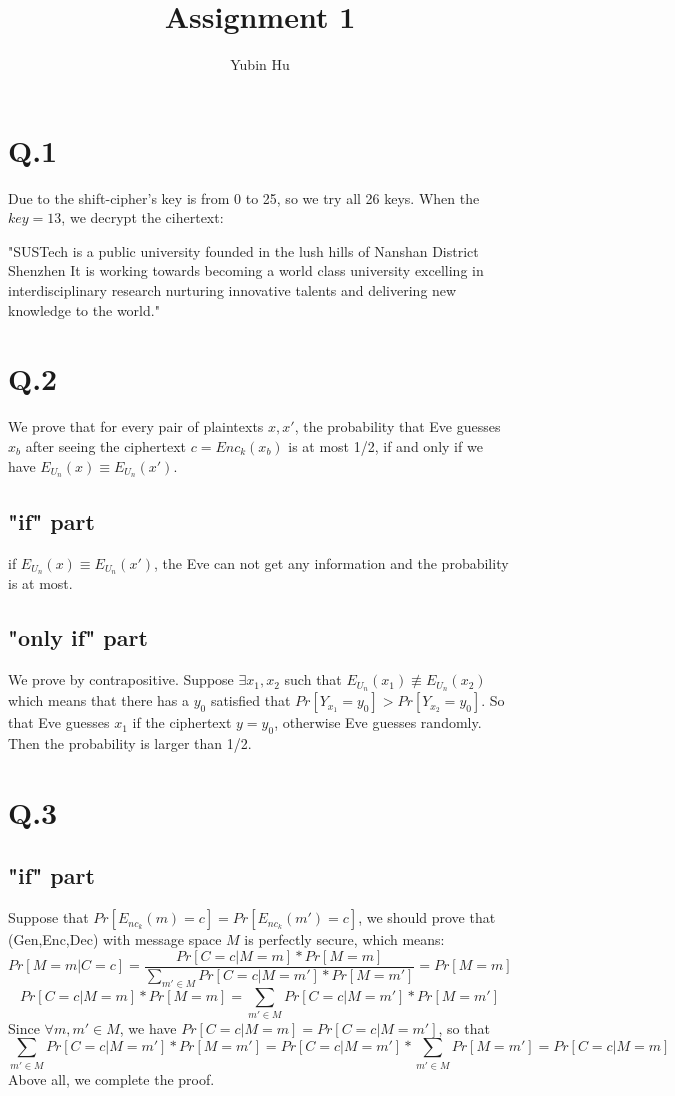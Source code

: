 \documentclass[onecolumn,oneside]{SUSTechHomework}
\author{Yubin Hu}
\title{Assignment 1}
\begin{document}
  \maketitle

  \section*{Q.1}
  Due to the shift-cipher's key is from 0 to 25, so we try all 26 keys. When the $key = 13$, we decrypt the cihertext:

  "SUSTech is a public university founded in the lush hills of Nanshan District Shenzhen It is working towards becoming a world class university excelling in interdisciplinary research nurturing innovative talents and delivering new knowledge to the world."

  \section*{Q.2}
  We prove that for every pair of plaintexts $x, x'$, the probability that Eve guesses $x_b$ after seeing the ciphertext $c=Enc_k(x_b)$ is at most 1/2, if and only if we have $E_{U_n}(x) \equiv E_{U_n}(x')$.

  \subsection*{"if" part}
  if $E_{U_n}(x) \equiv E_{U_n}(x')$, the Eve can not get any information and the probability is at most.

  \subsection*{"only if" part}
  We prove by contrapositive.
  Suppose $\exists x_1, x_2$ such that $E_{U_n}(x_1) \not\equiv​ E_{U_n}(x_2)$ which means that there has a $y_0$ satisfied that $Pr[Y_{x_1}=y_0]>Pr[Y_{x_2}=y_0]$. So that Eve guesses $x_1$ if the ciphertext $y=y_0$, otherwise Eve guesses randomly. Then the probability is larger than 1/2.

  \section*{Q.3}

  \subsection*{"if" part}
  Suppose that $Pr[E_{nc_k}(m)=c]=Pr[E_{nc_k}(m')=c]$, we should prove that (Gen,Enc,Dec) with message space $M$ is perfectly secure, which means:
  $$Pr[M=m|C=c]=\frac{Pr[C=c|M=m]*Pr[M=m]}{\sum_{m' \in M}Pr[C=c|M=m']*Pr[M=m']}=Pr[M=m]$$
  $$Pr[C=c|M=m]*Pr[M=m]=\sum_{m' \in M}Pr[C=c|M=m']*Pr[M=m']$$
  Since $\forall m, m' \in M$, we have $Pr[C=c|M=m]=Pr[C=c|M=m']$, so that
  $$\sum_{m' \in M}Pr[C=c|M=m']*Pr[M=m']=Pr[C=c|M=m']*\sum_{m' \in M}Pr[M=m']=Pr[C=c|M=m]$$
  Above all, we complete the proof.
\end{document}

